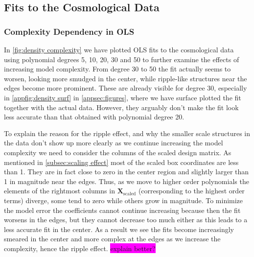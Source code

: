 \documentclass[aps,pra,english,notitlepage,reprint,nofootinbib]{revtex4-1}  %
\begin{document}
\subsection{Fits to the Cosmological Data}
\subsubsection{Complexity Dependency in OLS}
In \cref{fig:density complexity} we have plotted OLS fits to the cosmological data using polynomial degrees 5, 10, 20, 30 and 50 to further examine the effects of increasing model complexity. From degree 30 to 50 the fit actually seems to worsen, looking more smudged in the center, while ripple-like structures near the edges become more prominent. These are already visible for degree 30, especially in \cref{appfig:density surf} in \cref{appsec:figures}, where we have surface plotted the fit together with the actual data. However, they arguably don't make the fit look less accurate than that obtained with polynomial degree 20.

To explain the reason for the ripple effect, and why the smaller scale structures in the data don't show up more clearly as we continue increasing the model complexity we need to consider the columns of the scaled design matrix. As mentioned in \cref{subsec:scaling effect} most of the scaled box coordinates are less than 1. They are in fact close to zero in the center region and slightly larger than 1 in magnitude near the edges. Thus, as we move to higher order polynomials the elements of the rightmost columns in $\mathbf{X}_\text{scaled}$ (corresponding to the highest order terms) diverge, some tend to zero while others grow in magnitude. To minimize the model error the coefficients cannot continue increasing because then the fit worsens in the edges, but they cannot decrease too much either as this leads to a less accurate fit in the center. As a result we see the fits become increasingly smeared in the center and more complex at the edges as we increase the complexity, hence the ripple effect. \colorbox{magenta}{explain better?} 
\end{document}
